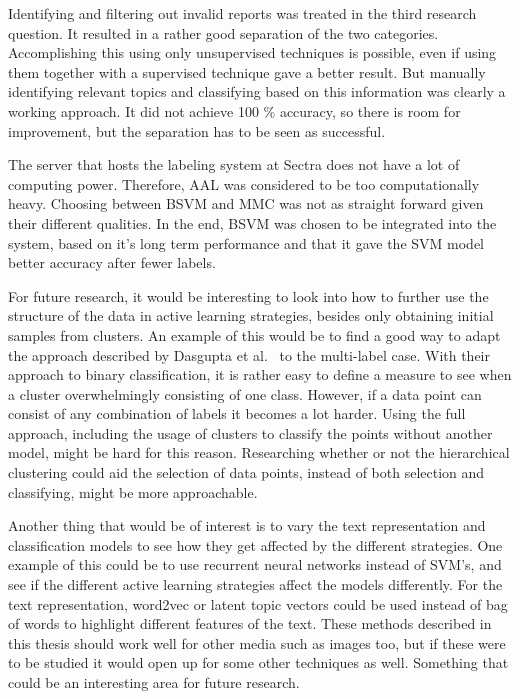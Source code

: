 Identifying and filtering out invalid reports was treated in the third research question.
It resulted in a rather good separation of the two categories.
Accomplishing this using only unsupervised techniques is possible, even if using them together with a supervised technique gave a better result.
But manually identifying relevant topics and classifying based on this information was clearly a working approach.
It did not achieve 100 \% accuracy, so there is room for improvement, but the separation has to be seen as successful.

The server that hosts the labeling system at Sectra does not have a lot of computing power.
Therefore, AAL was considered to be too computationally heavy.
Choosing between BSVM and MMC was not as straight forward given their different qualities.
In the end, BSVM was chosen to be integrated into the system, based on it's long term performance and that it gave the SVM model better accuracy after fewer labels.

For future research, it would be interesting to look into how to further use the structure of the data in active learning strategies, besides only obtaining initial samples from clusters.
An example of this would be to find a good way to adapt the approach described by Dasgupta et al\@.~\cite{dasgupta2008hierarchical} to the multi-label case.
With their approach to binary classification, it is rather easy to define a measure to see when a cluster overwhelmingly consisting of one class.
However, if a data point can consist of any combination of labels it becomes a lot harder.
Using the full approach, including the usage of clusters to classify the points without another model, might be hard for this reason.
Researching whether or not the hierarchical clustering could aid the selection of data points, instead of both selection and classifying, might be more approachable.

Another thing that would be of interest is to vary the text representation and classification models to see how they get affected by the different strategies.
One example of this could be to use recurrent neural networks instead of SVM's, and see if the different active learning strategies affect the models differently.
For the text representation, word2vec or latent topic vectors could be used instead of bag of words to highlight different features of the text.
These methods described in this thesis should work well for other media such as images too, but if these were to be studied it would open up for some other techniques as well.
Something that could be an interesting area for future research.